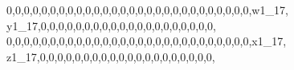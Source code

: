 \documentclass[]{article}
\newenvironment{Shaded}{\begin{snugshade}}{\end{snugshade}}
\newcommand{\DecValTok}[1]{\textcolor[rgb]{0.00,0.00,0.81}{#1}}
\newcommand{\NormalTok}[1]{#1}
\begin{document}
\begin{Shaded}
\begin{Highlighting}[]
\DecValTok{0}\NormalTok{,}\DecValTok{0}\NormalTok{,}\DecValTok{0}\NormalTok{,}\DecValTok{0}\NormalTok{,}\DecValTok{0}\NormalTok{,}\DecValTok{0}\NormalTok{,}\DecValTok{0}\NormalTok{,}\DecValTok{0}\NormalTok{,}\DecValTok{0}\NormalTok{,}\DecValTok{0}\NormalTok{,}\DecValTok{0}\NormalTok{,}\DecValTok{0}\NormalTok{,}\DecValTok{0}\NormalTok{,}\DecValTok{0}\NormalTok{,}\DecValTok{0}\NormalTok{,}\DecValTok{0}\NormalTok{,}\DecValTok{0}\NormalTok{,}\DecValTok{0}\NormalTok{,}\DecValTok{0}\NormalTok{,}\DecValTok{0}\NormalTok{,}\DecValTok{0}\NormalTok{,}\DecValTok{0}\NormalTok{,}\DecValTok{0}\NormalTok{,}\DecValTok{0}\NormalTok{,}\DecValTok{0}\NormalTok{,}\DecValTok{0}\NormalTok{,}\DecValTok{0}\NormalTok{,}\DecValTok{0}\NormalTok{,w1_}\DecValTok{17}\NormalTok{, y1_}\DecValTok{17}\NormalTok{,}\DecValTok{0}\NormalTok{,}\DecValTok{0}\NormalTok{,}\DecValTok{0}\NormalTok{,}\DecValTok{0}\NormalTok{,}\DecValTok{0}\NormalTok{,}\DecValTok{0}\NormalTok{,}\DecValTok{0}\NormalTok{,}\DecValTok{0}\NormalTok{,}\DecValTok{0}\NormalTok{,}\DecValTok{0}\NormalTok{,}\DecValTok{0}\NormalTok{,}\DecValTok{0}\NormalTok{,}\DecValTok{0}\NormalTok{,}\DecValTok{0}\NormalTok{,}\DecValTok{0}\NormalTok{,}\DecValTok{0}\NormalTok{,}\DecValTok{0}\NormalTok{,}\DecValTok{0}\NormalTok{,}\DecValTok{0}\NormalTok{,}\DecValTok{0}\NormalTok{,}
\DecValTok{0}\NormalTok{,}\DecValTok{0}\NormalTok{,}\DecValTok{0}\NormalTok{,}\DecValTok{0}\NormalTok{,}\DecValTok{0}\NormalTok{,}\DecValTok{0}\NormalTok{,}\DecValTok{0}\NormalTok{,}\DecValTok{0}\NormalTok{,}\DecValTok{0}\NormalTok{,}\DecValTok{0}\NormalTok{,}\DecValTok{0}\NormalTok{,}\DecValTok{0}\NormalTok{,}\DecValTok{0}\NormalTok{,}\DecValTok{0}\NormalTok{,}\DecValTok{0}\NormalTok{,}\DecValTok{0}\NormalTok{,}\DecValTok{0}\NormalTok{,}\DecValTok{0}\NormalTok{,}\DecValTok{0}\NormalTok{,}\DecValTok{0}\NormalTok{,}\DecValTok{0}\NormalTok{,}\DecValTok{0}\NormalTok{,}\DecValTok{0}\NormalTok{,}\DecValTok{0}\NormalTok{,}\DecValTok{0}\NormalTok{,}\DecValTok{0}\NormalTok{,}\DecValTok{0}\NormalTok{,}\DecValTok{0}\NormalTok{,x1_}\DecValTok{17}\NormalTok{, z1_}\DecValTok{17}\NormalTok{,}\DecValTok{0}\NormalTok{,}\DecValTok{0}\NormalTok{,}\DecValTok{0}\NormalTok{,}\DecValTok{0}\NormalTok{,}\DecValTok{0}\NormalTok{,}\DecValTok{0}\NormalTok{,}\DecValTok{0}\NormalTok{,}\DecValTok{0}\NormalTok{,}\DecValTok{0}\NormalTok{,}\DecValTok{0}\NormalTok{,}\DecValTok{0}\NormalTok{,}\DecValTok{0}\NormalTok{,}\DecValTok{0}\NormalTok{,}\DecValTok{0}\NormalTok{,}\DecValTok{0}\NormalTok{,}\DecValTok{0}\NormalTok{,}\DecValTok{0}\NormalTok{,}\DecValTok{0}\NormalTok{,}\DecValTok{0}\NormalTok{,}\DecValTok{0}\NormalTok{,}

\end{Highlighting}
\end{Shaded}
\end{document}
